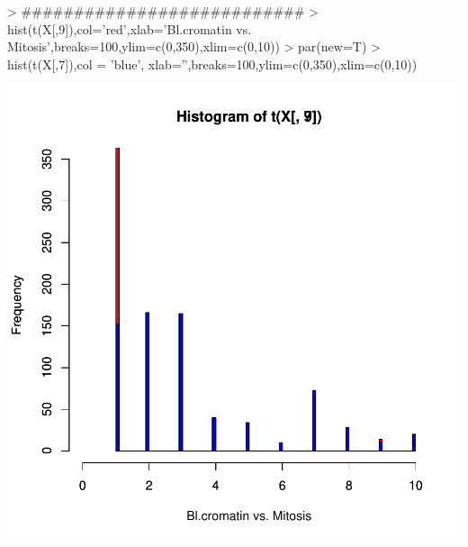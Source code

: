 \documentclass{article}
\begin{document}
\begin{Schunk}
\begin{Sinput}
> ###########################
> hist(t(X[,9]),col='red',xlab='Bl.cromatin vs. Mitosis',breaks=100,ylim=c(0,350),xlim=c(0,10))
> par(new=T)
> hist(t(X[,7]),col = 'blue', xlab='',breaks=100,ylim=c(0,350),xlim=c(0,10))
\end{Sinput}
\end{Schunk}
\includegraphics{selecao-012}
\end{document}
